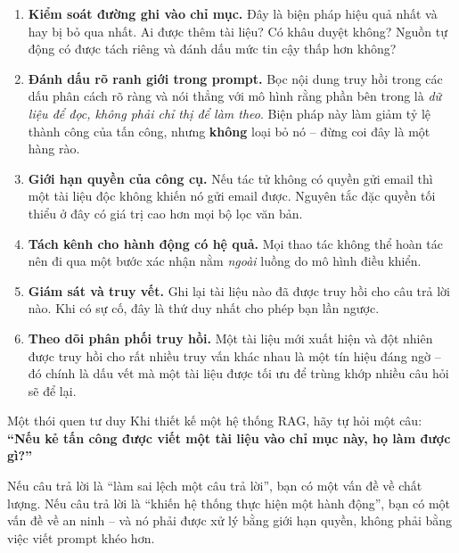 \begin{enumerate}
	\item \textbf{Kiểm soát đường ghi vào chỉ mục.} Đây là biện pháp hiệu quả nhất và hay bị bỏ qua nhất. Ai được thêm tài liệu? Có khâu duyệt không? Nguồn tự động có được tách riêng và đánh dấu mức tin cậy thấp hơn không?
	\item \textbf{Đánh dấu rõ ranh giới trong prompt.} Bọc nội dung truy hồi trong các dấu phân cách rõ ràng và nói thẳng với mô hình rằng phần bên trong là \emph{dữ liệu để đọc, không phải chỉ thị để làm theo}. Biện pháp này làm giảm tỷ lệ thành công của tấn công, nhưng \textbf{không} loại bỏ nó -- đừng coi đây là một hàng rào.
	\item \textbf{Giới hạn quyền của công cụ.} Nếu tác tử không có quyền gửi email thì một tài liệu độc không khiến nó gửi email được. Nguyên tắc đặc quyền tối thiểu ở đây có giá trị cao hơn mọi bộ lọc văn bản.
	\item \textbf{Tách kênh cho hành động có hệ quả.} Mọi thao tác không thể hoàn tác nên đi qua một bước xác nhận nằm \emph{ngoài} luồng do mô hình điều khiển.
	\item \textbf{Giám sát và truy vết.} Ghi lại tài liệu nào đã được truy hồi cho câu trả lời nào. Khi có sự cố, đây là thứ duy nhất cho phép bạn lần ngược.
	\item \textbf{Theo dõi phân phối truy hồi.} Một tài liệu mới xuất hiện và đột nhiên được truy hồi cho rất nhiều truy vấn khác nhau là một tín hiệu đáng ngờ -- đó chính là dấu vết mà một tài liệu được tối ưu để trùng khớp nhiều câu hỏi sẽ để lại.
\end{enumerate}

\begin{pitfall}{Một thói quen tư duy}
Khi thiết kế một hệ thống RAG, hãy tự hỏi một câu: \textbf{“Nếu kẻ tấn công được viết một tài liệu vào chỉ mục này, họ làm được gì?”}

Nếu câu trả lời là “làm sai lệch một câu trả lời”, bạn có một vấn đề về chất lượng. Nếu câu trả lời là “khiến hệ thống thực hiện một hành động”, bạn có một vấn đề về an ninh -- và nó phải được xử lý bằng giới hạn quyền, không phải bằng việc viết prompt khéo hơn.
\end{pitfall}
